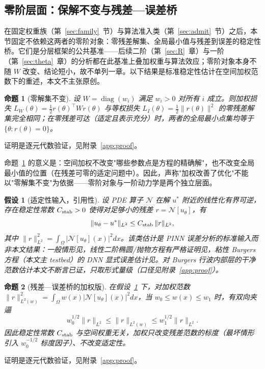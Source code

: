 \documentclass[fontset=windows,11pt]{ctexart}
\newcommand{\W}{W}
\DeclareMathOperator{\diag}{diag}
\newtheorem{assumption}{假设}[section]
\newtheorem{proposition}{命题}[section]
\numberwithin{equation}{section}
\begin{document}
\subsection{零阶层面：保解不变与残差—误差桥}\label{sec:Schan}
在固定权重族（第~\ref{sec:family}~节）与算法准入类（第~\ref{sec:admit}~节）之后，本节固定不依赖这两者的零阶对象：零残差解集、全局最小值与残差到误差的稳定性桥。它们是分层框架的公共基准——后续二阶（第~\ref{sec:R}~章）与一阶（第~\ref{sec:theta}~章）的分析都在此基准上叠加权重与算法效应；零阶对象本身不随 $\W$ 改变、结论短小，故不单列一章。以下结果是标准稳定性估计在空间加权范数下的重述，本文不主张原创。

\begin{proposition}[零解集不变]\label{prop:zero}
设 $\W=\diag(w_i)$ 满足 $w_i>0$ 对所有 $i$ 成立。则加权损失 $L_\W(\theta)=\tfrac12 r(\theta)^\top\W r(\theta)$ 与等权损失 $L_I(\theta)=\tfrac12\|r(\theta)\|^2$ 的零残差解集完全相同；在零残差可达（适定且表示充分）时，两者的全局最小点集均等于 $\{\theta:r(\theta)=0\}$。
\end{proposition}
证明是逐元代数验证，见附录~\ref{app:proof}。

命题~\ref{prop:zero} 的意义是：空间加权不改变"哪些参数点是方程的精确解"，也不改变全局最小值的位置（在残差可零的适定问题中）。因此，声称"加权改善了优化"不能以"零解集不变"为依据——零阶对象与一阶动力学是两个独立层面。

\begin{assumption}[适定性输入，引用性]\label{ass:wellposed}
设 PDE 算子 $\mathcal N$ 在解 $u^*$ 附近的线性化有界可逆，存在稳定性常数 $C_{\rm stab}>0$ 使得对足够小的残差 $r=\mathcal N[u_\theta]$，有
\begin{equation}\label{eq:bridge}
\|u_\theta-u^*\|_{L^2}\le C_{\rm stab}\,\|r\|_{L^2},
\end{equation}
其中 $\|r\|_{L^2}^2=\int_\Omega |\mathcal N[u_\theta](x)|^2 dx$。该类估计是 PINN 误差分析的\emph{标准输入}而非本文结果：一般情形见\cite{MishraMolinaro2020,DeRyckMishra2022}，线性二阶椭圆/抛物方程有严格证明见\cite{Shin2020}，粘性 Burgers 方程（本文主 testbed）的 DNN 显式误差估计见\cite{Akram2025}。对 Burgers 行波内部层的干净范数估计本文不断言已证，只取形式量级（口径见附录~\ref{app:proof}）。
\end{assumption}

\begin{proposition}[残差—误差桥的加权版]\label{prop:bridge}
在假设~\ref{ass:wellposed} 下，对加权范数 $\|r\|_{L^2(w)}^2=\int_\Omega w(x)|\mathcal N[u_\theta](x)|^2 dx$，当 $w_0\le w(x)\le w_1$ 时，有双向夹逼
\begin{equation}\label{eq:bridge-weighted}
w_0^{1/2}\|r\|_{L^2}\le \|r\|_{L^2(w)}\le w_1^{1/2}\|r\|_{L^2}.
\end{equation}
因此稳定性常数 $C_{\rm stab}$ 与空间权重无关，加权只改变残差范数的标度（最坏情形引入 $w_0^{-1/2}$ 标度因子）、不改变适定性。
\end{proposition}
证明是逐元代数验证，见附录~\ref{app:proof}。
\end{document}
